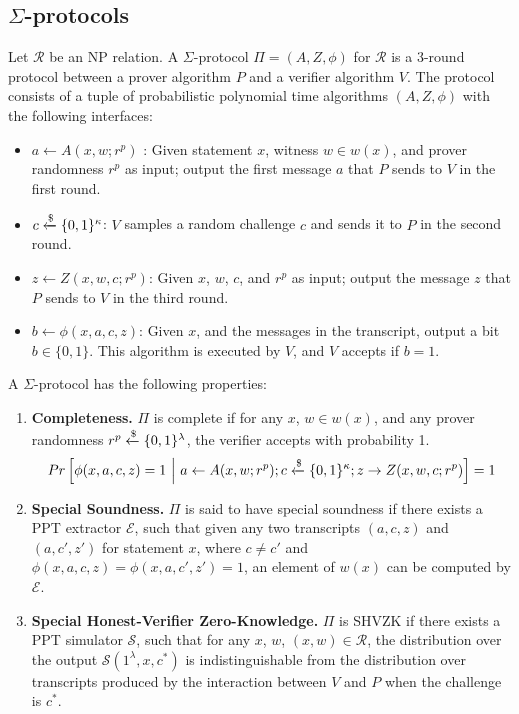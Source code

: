 \subsection{$\Sigma$-protocols}
\begin{definition}
Let $\mathcal R$ be an NP relation. A $\Sigma$-protocol $\Pi = (A, Z, \phi)$ for $\mathcal R$ is a 3-round protocol between a prover algorithm $P$ and a verifier algorithm $V$. The protocol consists of a tuple of probabilistic polynomial time algorithms $(A, Z, \phi)$ with the following interfaces:
\begin{itemize}
    \item $a \leftarrow A(x,w; r^p)$ : Given statement $x$, witness $w \in w(x)$, and prover randomness $r^p$ as input; output the first message $a$ that $P$ sends to $V$ in the first round. 
    \item $c \xleftarrow{\$} \{0,1\}^\kappa$: $V$ samples a random challenge $c$ and sends it to $P$ in the second round. 
    \item $z \leftarrow Z(x,w,c; r^p)$: Given $x$, $w$, $c$, and $r^p$ as input; output the message $z$ that $P$ sends to $V$ in the third round.
    \item $b \leftarrow \phi(x,a,c,z)$: Given $x$, and the messages in the transcript, output a bit $b \in \{0,1\}$. This algorithm is executed by $V$, and $V$ accepts if $b = 1$.
\end{itemize}
A $\Sigma$-protocol has the following properties:
\begin{enumerate}
    \item \textbf{Completeness.} $\Pi$ is complete if for any $x$, $w \in w(x)$, and any prover randomness $r^p \xleftarrow{\$} \{0,1\}^\lambda$, the verifier accepts with probability 1. 
    \begin{gather*}
        Pr\left[\phi(x,a,c,z) = 1 \ \middle\vert\  a \leftarrow A(x,w;r^p); c\xleftarrow{\$} \{0,1\}^\kappa; z \rightarrow Z(x,w,c;r^p)\right] = 1
    \end{gather*}
    \item \textbf{Special Soundness.} $\Pi$ is said to have special soundness if  there exists a PPT extractor $\mathcal E$, such that given any two transcripts $(a,c,z)$ and $(a,c',z')$ for statement $x$, where $c \ne c'$ and $\phi(x,a,c,z) = \phi(x,a,c',z') = 1$, an element of $w(x)$ can be computed by $\mathcal E$.
    \item \textbf{Special Honest-Verifier Zero-Knowledge.} $\Pi$ is SHVZK if there exists a PPT simulator $\mathcal S$, such that for any $x$, $w$, $(x,w) \in \mathcal R$, the distribution over the output $\mathcal S(1^\lambda, x, c^*)$ is indistinguishable from the distribution over transcripts produced by the interaction between $V$ and $P$ when the challenge is $c^*$.

\end{enumerate}
\end{definition}
